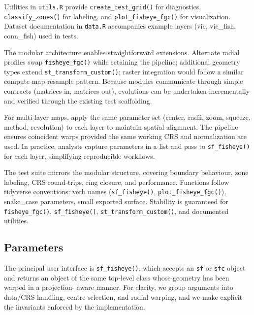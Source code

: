 Utilities in \texttt{utils.R} provide \texttt{create\_test\_grid()} for diagnostics, \texttt{classify\_zones()} for labeling, and \texttt{plot\_fisheye\_fgc()} for visualization. Dataset documentation in \texttt{data.R} accompanies example layers (vic, vic\_fish, conn\_fish) used in tests.

The modular architecture enables straightforward extensions. Alternate radial profiles swap \texttt{fisheye\_fgc()} while retaining the pipeline; additional geometry types extend \texttt{st\_transform\_custom()}; raster integration would follow a similar compute-map-resample pattern. Because modules communicate through simple contracts (matrices in, matrices out), evolutions can be undertaken incrementally and verified through the existing test scaffolding.

For multi-layer maps, apply the same parameter set (center, radii, zoom, squeeze, method, revolution) to each layer to maintain spatial alignment. The pipeline ensures coincident warps provided the same working CRS and normalization are used. In practice, analysts capture parameters in a list and pass to \texttt{sf\_fisheye()} for each layer, simplifying reproducible workflows.

The test suite mirrors the modular structure, covering boundary behaviour, zone labeling, CRS round-trips, ring closure, and performance. Functions follow tidyverse conventions: verb names (\texttt{sf\_fisheye()}, \texttt{plot\_fisheye\_fgc()}), snake\_case parameters, small exported surface. Stability is guaranteed for \texttt{fisheye\_fgc()}, \texttt{sf\_fisheye()}, \texttt{st\_transform\_custom()}, and documented utilities.

\subsection{Parameters}\label{parameters}

The principal user interface is \texttt{sf\_fisheye()}, which accepts an \texttt{sf} or \texttt{sfc} object
and returns an object of the same top-level class whose geometry has been warped in a projection-
aware manner. For clarity, we group arguments into data/CRS handling, centre selection, and radial
warping, and we make explicit the invariants enforced by the implementation.

